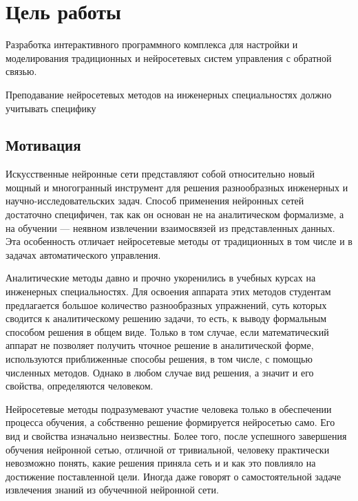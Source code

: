 
\section{Цель работы}


Разработка интерактивного программного комплекса для настройки и
моделирования традиционных и нейросетевых систем управления с обратной
связью.

Преподавание нейросетевых методов на инженерных специальностях должно учитывать специфику 


\subsection{Мотивация}

Искусственные нейронные сети представляют собой относительно новый
мощный и многогранный инструмент для решения разнообразных инженерных
и научно-исследовательских задач.  Способ применения нейронных сетей
достаточно специфичен, так как он основан не на аналитическом
формализме, а на обучении --- неявном извлечении взаимосвязей из
представленных данных.  Эта особенность отличает нейросетевые методы
от традиционных в том числе и в задачах автоматического управления.

Аналитические методы давно и прочно укоренились в учебных курсах на
инженерных специальностях.  Для освоения аппарата этих методов
студентам предлагается большое количество разнообразных упражнений,
суть которых сводится к аналитическому решению задачи, то есть, к
выводу формальным способом решения в общем виде.  Только в том случае,
если математический аппарат не позволяет получить чточное решение в
аналитической форме, используются приближенные способы решения, в том
числе, с помощью численных методов.  Однако в любом случае вид
решения, а значит и его свойства, определяются человеком.

Нейросетевые методы подразумевают участие человека только в
обеспечении процесса обучения, а собственно решение формируется
нейросетью само.  Его вид и свойства изначально неизвестны.  Более
того, после успешного завершения обучения нейронной сетью, отличной от
тривиальной, человеку практически невозможно понять, какие решения
приняла сеть и и как это повлияло на достижение поставленной цели.
Иногда даже говорят о самостоятельной задаче извлечения знаний из
обучечнной нейронной сети.

